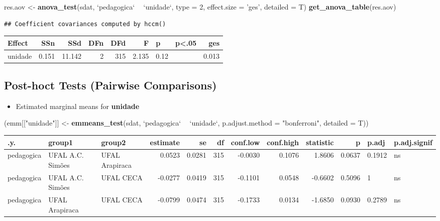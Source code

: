 \documentclass[]{article}
\newenvironment{Shaded}{\begin{snugshade}}{\end{snugshade}}
\newcommand{\DataTypeTok}[1]{\textcolor[rgb]{0.13,0.29,0.53}{#1}}
\newcommand{\DecValTok}[1]{\textcolor[rgb]{0.00,0.00,0.81}{#1}}
\newcommand{\KeywordTok}[1]{\textcolor[rgb]{0.13,0.29,0.53}{\textbf{#1}}}
\newcommand{\NormalTok}[1]{#1}
\newcommand{\OperatorTok}[1]{\textcolor[rgb]{0.81,0.36,0.00}{\textbf{#1}}}
\newcommand{\StringTok}[1]{\textcolor[rgb]{0.31,0.60,0.02}{#1}}
\providecommand{\tightlist}{%
  \setlength{\itemsep}{0pt}\setlength{\parskip}{0pt}}
\begin{document}
\begin{Shaded}
\begin{Highlighting}[]
\NormalTok{res.aov <-}\StringTok{ }\KeywordTok{anova_test}\NormalTok{(sdat, }\StringTok{`}\DataTypeTok{pedagogica}\StringTok{`} \OperatorTok{~}\StringTok{ `}\DataTypeTok{unidade}\StringTok{`}\NormalTok{, }\DataTypeTok{type =} \DecValTok{2}\NormalTok{, }\DataTypeTok{effect.size =} \StringTok{'ges'}\NormalTok{, }\DataTypeTok{detailed =}\NormalTok{ T)}
\KeywordTok{get_anova_table}\NormalTok{(res.aov)}
\end{Highlighting}
\end{Shaded}

\begin{verbatim}
## Coefficient covariances computed by hccm()
\end{verbatim}

\begin{longtable}[]{@{}lrrrrrllr@{}}
\toprule
Effect & SSn & SSd & DFn & DFd & F & p & p\textless{}.05 &
ges\tabularnewline
\midrule
\endhead
unidade & 0.151 & 11.142 & 2 & 315 & 2.135 & 0.12 & &
0.013\tabularnewline
\bottomrule
\end{longtable}

\hypertarget{post-hoct-tests-pairwise-comparisons}{%
\subsection{Post-hoct Tests (Pairwise
Comparisons)}\label{post-hoct-tests-pairwise-comparisons}}

\begin{itemize}
\tightlist
\item
  Estimated marginal means for \textbf{unidade}
\end{itemize}

\begin{Shaded}
\begin{Highlighting}[]
\NormalTok{(emm[[}\StringTok{"unidade"}\NormalTok{]] <-}\StringTok{ }\KeywordTok{emmeans_test}\NormalTok{(sdat, }\StringTok{`}\DataTypeTok{pedagogica}\StringTok{`} \OperatorTok{~}\StringTok{ `}\DataTypeTok{unidade}\StringTok{`}\NormalTok{, }\DataTypeTok{p.adjust.method =} \StringTok{"bonferroni"}\NormalTok{, }\DataTypeTok{detailed =}\NormalTok{ T))}
\end{Highlighting}
\end{Shaded}

\begin{longtable}[]{@{}lllrrrrrrrll@{}}
\toprule
.y. & group1 & group2 & estimate & se & df & conf.low & conf.high &
statistic & p & p.adj & p.adj.signif\tabularnewline
\midrule
\endhead
pedagogica & UFAL A.C. Simões & UFAL Arapiraca & 0.0523 & 0.0281 & 315 &
-0.0030 & 0.1076 & 1.8606 & 0.0637 & 0.1912 & ns\tabularnewline
pedagogica & UFAL A.C. Simões & UFAL CECA & -0.0277 & 0.0419 & 315 &
-0.1101 & 0.0548 & -0.6602 & 0.5096 & 1 & ns\tabularnewline
pedagogica & UFAL Arapiraca & UFAL CECA & -0.0799 & 0.0474 & 315 &
-0.1733 & 0.0134 & -1.6850 & 0.0930 & 0.2789 & ns\tabularnewline
\bottomrule
\end{longtable}
\end{document}
